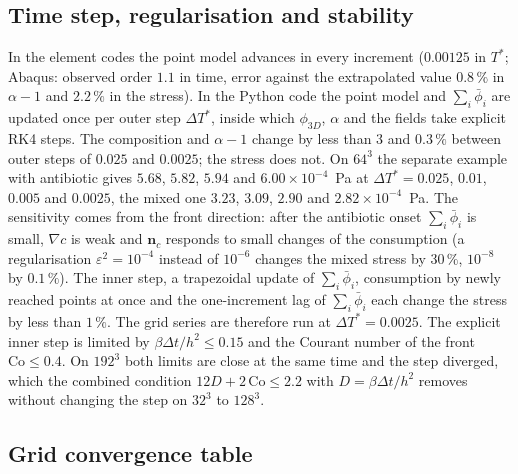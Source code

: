 \documentclass[11pt,a4paper]{article}
\newcommand{\phiD}{\phi_{3D}}
\newcommand{\lv}{\textstyle\sum_i\bar\phi_i}
\newcommand{\nc}{\mathbf n_c}
\begin{document}
\subsection{Time step, regularisation and stability}
\label{app:timestep}

In the element codes the point model advances in every increment ($0.00125$ in $T^*$; Abaqus: observed order $1.1$ in time, error against the extrapolated value $0.8\,\%$ in $\alpha-1$ and $2.2\,\%$ in the stress). In the Python code the point model and $\lv$ are updated once per outer step $\Delta T^*$, inside which $\phiD$, $\alpha$ and the fields take explicit RK4 steps. The composition and $\alpha-1$ change by less than $3$ and $0.3\,\%$ between outer steps of $0.025$ and $0.0025$; the stress does not. On $64^3$ the separate example with antibiotic gives $5.68$, $5.82$, $5.94$ and $6.00\times10^{-4}$~Pa at $\Delta T^*=0.025$, $0.01$, $0.005$ and $0.0025$, the mixed one $3.23$, $3.09$, $2.90$ and $2.82\times10^{-4}$~Pa. The sensitivity comes from the front direction: after the antibiotic onset $\lv$ is small, $\nabla c$ is weak and $\nc$ responds to small changes of the consumption (a regularisation $\varepsilon^2=10^{-4}$ instead of $10^{-6}$ changes the mixed stress by $30\,\%$, $10^{-8}$ by $0.1\,\%$). The inner step, a trapezoidal update of $\lv$, consumption by newly reached points at once and the one-increment lag of $\lv$ each change the stress by less than $1\,\%$. The grid series are therefore run at $\Delta T^*=0.0025$. The explicit inner step is limited by $\beta\Delta t/h^2\le0.15$ and the Courant number of the front $\mathrm{Co}\le0.4$. On $192^3$ both limits are close at the same time and the step diverged, which the combined condition $12D+2\,\mathrm{Co}\le2.2$ with $D=\beta\Delta t/h^2$ removes without changing the step on $32^3$ to $128^3$.

\subsection{Grid convergence table}
\label{app:gci}
\end{document}
